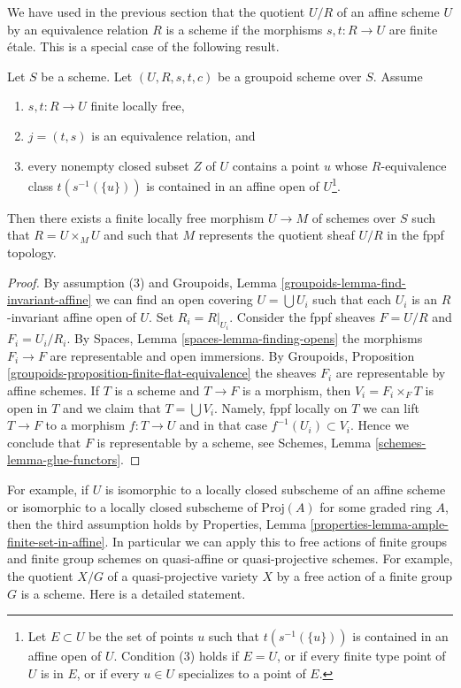 \noindent
We have used in the previous section that the quotient $U/R$ of an
affine scheme $U$ by an equivalence relation $R$ is a scheme if the
morphisms $s, t : R \to U$ are finite \'etale. This is a special case
of the following result.

\begin{proposition}
\label{proposition-finite-flat-equivalence-global}
Let $S$ be a scheme.
Let $(U, R, s, t, c)$ be a groupoid scheme over $S$.
Assume
\begin{enumerate}
\item $s, t : R \to U$ finite locally free,
\item $j = (t, s)$ is an equivalence relation, and
\item every nonempty closed subset $Z$ of $U$ contains a point
$u$ whose $R$-equivalence class $t(s^{-1}(\{u\}))$ is contained
in an affine open of $U$\footnote{Let $E \subset U$ be the
set of points $u$ such that $t(s^{-1}(\{u\}))$
is contained in an affine open of $U$. Condition (3) holds
if $E = U$, or if every finite type point of $U$ is in $E$, or
if every $u \in U$ specializes to a point of $E$.}.
\end{enumerate}
Then there exists a finite locally free morphism $U \to M$
of schemes over $S$ such that $R = U \times_M U$ and such that $M$
represents the quotient sheaf $U/R$ in the fppf topology.
\end{proposition}

\begin{proof}
By assumption (3) and
Groupoids, Lemma \ref{groupoids-lemma-find-invariant-affine}
we can find an open covering $U = \bigcup U_i$ such that each $U_i$
is an $R$-invariant affine open of $U$. Set $R_i = R|_{U_i}$.
Consider the fppf sheaves $F = U/R$ and $F_i = U_i/R_i$.
By Spaces, Lemma \ref{spaces-lemma-finding-opens} the morphisms
$F_i \to F$ are representable and open immersions.
By Groupoids, Proposition \ref{groupoids-proposition-finite-flat-equivalence}
the sheaves $F_i$ are representable by affine schemes.
If $T$ is a scheme and $T \to F$ is a morphism, then $V_i = F_i \times_F T$
is open in $T$ and we claim that $T = \bigcup V_i$. Namely,
fppf locally on $T$ we can lift $T \to F$ to a morphism
$f : T \to U$ and in that case $f^{-1}(U_i) \subset V_i$.
Hence we conclude that $F$ is representable by a scheme, see
Schemes, Lemma \ref{schemes-lemma-glue-functors}.
\end{proof}

\noindent
For example, if $U$ is isomorphic to a locally closed subscheme of an
affine scheme or isomorphic to a locally closed subscheme of
$\text{Proj}(A)$ for some graded ring $A$, then the third assumption holds by
Properties, Lemma \ref{properties-lemma-ample-finite-set-in-affine}.
In particular we can apply this to free actions of finite groups and
finite group schemes on quasi-affine or quasi-projective schemes.
For example, the quotient $X/G$ of a quasi-projective variety
$X$ by a free action of a finite group $G$ is a scheme. Here is a
detailed statement.

